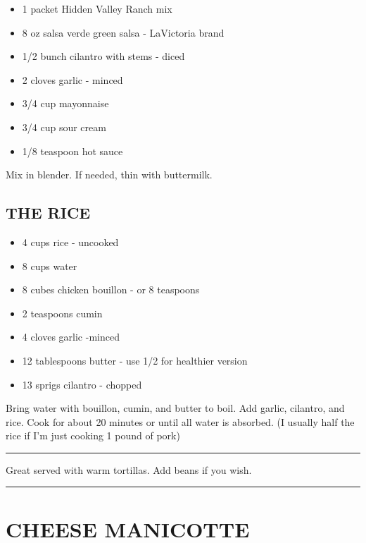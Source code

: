 \documentclass[
]{book}
\providecommand{\tightlist}{%
  \setlength{\itemsep}{0pt}\setlength{\parskip}{0pt}}
\begin{document}
\begin{itemize}
\tightlist
\item
  1 packet Hidden Valley Ranch mix
\item
  8 oz salsa verde green salsa - LaVictoria brand
\item
  1/2 bunch cilantro with stems - diced
\item
  2 cloves garlic - minced
\item
  3/4 cup mayonnaise
\item
  3/4 cup sour cream
\item
  1/8 teaspoon hot sauce
\end{itemize}

Mix in blender. If needed, thin with buttermilk.

\hypertarget{the-rice}{%
\subsection*{THE RICE}\label{the-rice}}


\begin{itemize}
\tightlist
\item
  4 cups rice - uncooked
\item
  8 cups water
\item
  8 cubes chicken bouillon - or 8 teaspoons
\item
  2 teaspoons cumin
\item
  4 cloves garlic -minced
\item
  12 tablespoons butter - use 1/2 for healthier version
\item
  13 sprigs cilantro - chopped
\end{itemize}

Bring water with bouillon, cumin, and butter to boil. Add garlic, cilantro,
and rice. Cook for about 20 minutes or until all water is absorbed.
(I usually half the rice if I'm just cooking 1 pound of pork)

\begin{center}\rule{0.5\linewidth}{0.5pt}\end{center}

Great served with warm tortillas. Add beans if you wish.

\begin{center}\rule{0.5\linewidth}{0.5pt}\end{center}

\hypertarget{cheese-manicotte}{%
\section*{CHEESE MANICOTTE}\label{cheese-manicotte}}
\end{document}

